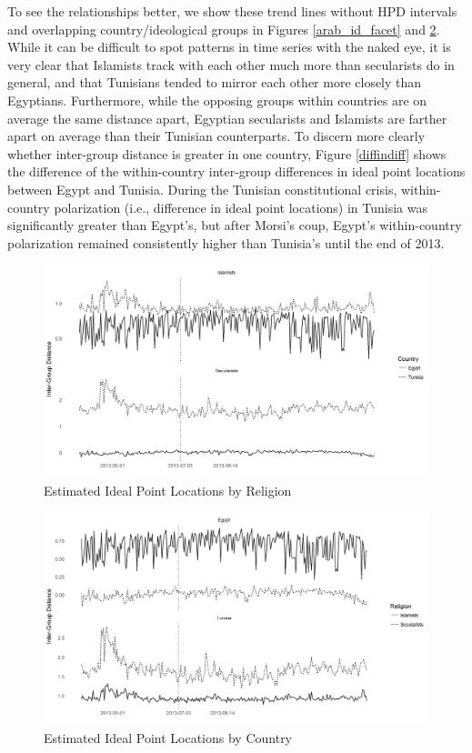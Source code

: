 \documentclass[12pt]{article}
\begin{document}
 To see the relationships better, we show these trend lines without HPD intervals and overlapping country/ideological groups in Figures \ref{arab_id_facet} and \ref{country_facet}. While it can be difficult to spot patterns in time series with the naked eye, it is very clear that Islamists track with each other much more than secularists do in general, and that Tunisians tended to mirror each other more closely than Egyptians. Furthermore, while the opposing groups within countries are on average the same distance apart, Egyptian secularists and Islamists are farther apart on average than their Tunisian counterparts. To discern more clearly whether inter-group distance is greater in one country, Figure \ref{diffindiff} shows the difference of the within-country inter-group differences in ideal point locations between Egypt and Tunisia. During the Tunisian constitutional crisis, within-country polarization (i.e., difference in ideal point locations) in Tunisia was significantly greater than Egypt's, but after Morsi's coup, Egypt's within-country polarization remained consistently higher than Tunisia's until the end of 2013.
 \begin{figure}[!h]
 	\centering
	\caption{Estimated Ideal Point Locations by Religion}\label{religion_facet}
	\centering
	\includegraphics[width=.9\linewidth]{religion_coint}
\end{figure}
 \begin{figure}[!h]
 	\centering
	\caption{Estimated Ideal Point Locations by Country}\label{country_facet}
	\centering
	\includegraphics[width=.9\linewidth]{country_coint}
\end{figure}
\end{document}
